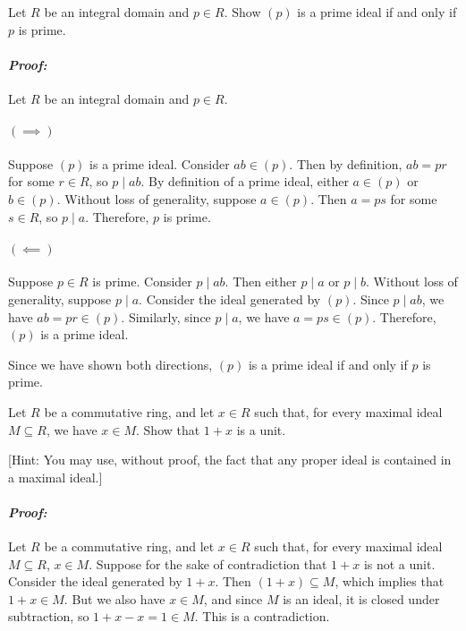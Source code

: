 \documentclass [12pt] {article}
\renewcommand{\it}[1]{\textit{{#1}}}
\newenvironment{problem}{\begin{tcolorbox}[title=Problem,colback=black!5!white,colframe=black!75!black]}{\end{tcolorbox}}
\newenvironment{response}{\begin{responseframe}\vspace{-10pt}\paragraph{\it{Proof:}}}{\end{responseframe}}
\begin{document}
\newpage
\begin{problem}
    Let $R$ be an integral domain and $p\in R$. Show $(p)$ is a prime ideal if
    and only if $p$ is prime.
\end{problem}
\begin{response}
    Let $R$ be an integral domain and $p\in R$.
    \paragraph{$\bm{(\implies)}$}
    Suppose $(p)$ is a prime ideal. Consider $ab\in (p)$. Then by definition,
    $ab=pr$ for some $r\in R$, so $p\mid ab$. By definition of a prime ideal,
    either $a\in (p)$ or $b\in (p)$. Without loss of generality, suppose
    $a\in (p)$. Then $a=ps$ for some $s\in R$, so $p\mid a$. Therefore, $p$ is
    prime.

    \paragraph{$\bm{(\impliedby)}$}
    Suppose $p\in R$ is prime. Consider $p\mid ab$. Then either $p\mid a$ or
    $p\mid b$. Without loss of generality, suppose $p\mid a$. Consider the ideal
    generated by $(p)$. Since $p\mid ab$, we have $ab=pr\in (p)$. Similarly,
    since $p\mid a$, we have $a=ps\in (p)$. Therefore, $(p)$ is a prime ideal.
    \vspace{1em}

    Since we have shown both directions, $(p)$ is a prime ideal if and only if
    $p$ is prime.
\end{response}

\newpage
\begin{problem}
    Let $R$ be a commutative ring, and let $x\in R$ such that, for every maximal
    ideal $M\subseteq R$, we have $x\in M$. Show that $1+x$ is a unit.
    \vspace{1em}

    [Hint: You may use, without proof, the fact that any proper ideal is
    contained in a maximal ideal.]
\end{problem}
\begin{response}
    Let $R$ be a commutative ring, and let $x\in R$ such that, for every maximal
    ideal $M\subseteq R$, $x\in M$. Suppose for the sake of contradiction that
    $1+x$ is not a unit. Consider the ideal generated by $1+x$. Then
    $(1+x)\subseteq M$, which implies that $1+x\in M$. But we also have $x\in M$,
    and since $M$ is an ideal, it is closed under subtraction, so $1+x-x=1\in M$.
    This is a contradiction.
\end{response}
\end{document}
